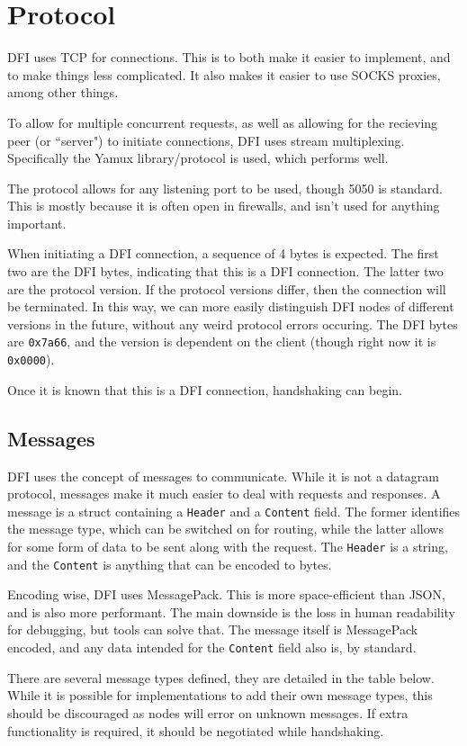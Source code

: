 \section{Protocol}
\begin{multicols}{2}
	DFI uses TCP for connections. This is to both make it easier to implement,
	and to make things less complicated. It also makes it easier to use SOCKS
	proxies, among other things.

	To allow for multiple concurrent requests, as well as allowing for the
	recieving peer (or ``server") to initiate connections, DFI uses stream
	multiplexing. Specifically the Yamux \cite{yamux} library/protocol is used, which 
	performs well.

	The protocol allows for any listening port to be used, though 5050 is
	standard. This is mostly because it is often open in firewalls, and isn't
	used for anything important.

	When initiating a DFI connection, a sequence of 4 bytes is expected. The
	first two are the DFI bytes, indicating that this is a DFI connection. The
	latter two are the protocol version. If the protocol versions differ, then
	the connection will be terminated. In this way, we can more easily
	distinguish DFI nodes of different versions in the future, without any weird
	protocol errors occuring. The DFI bytes are \texttt{0x7a66}, and the version
	is dependent on the client (though right now it is \texttt{0x0000}).

	Once it is known that this is a DFI connection, handshaking can begin.
\end{multicols}

	\subsection{Messages}
	\begin{multicols}{2}
	DFI uses the concept of messages to communicate. While it is not a datagram
	protocol, messages make it much easier to deal with requests and responses. A
	message is a struct containing a \texttt{Header} and a \texttt{Content}
	field. The former identifies the message type, which can be switched on for
	routing, while the latter allows for some form of data to be sent along with
	the request. The \texttt{Header} is a string, and the \texttt{Content} is anything that can be
	encoded to bytes.

	Encoding wise, DFI uses MessagePack. This is more space-efficient than JSON, and
	is also more performant. The main downside is the loss in human readability
	for debugging, but tools can solve that. The message itself is MessagePack
	encoded, and any data intended for the \texttt{Content} field also is, by standard.

	There are several message types defined, they are detailed in the 
	table below. While it is possible for implementations to add their own message
	types, this should be discouraged as nodes will error on unknown messages.
	If extra functionality is required, it should be negotiated while
	handshaking.
\end{multicols}

